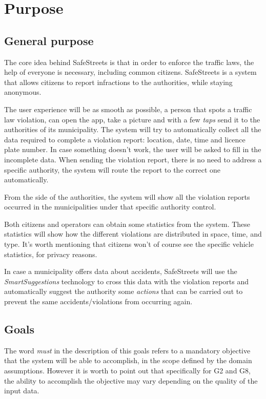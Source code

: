 \section{Purpose}
\subsection{General purpose}
The core idea behind SafeStreets is that in order to enforce the traffic laws,
the help of everyone is necessary, including common citizens.
SafeStreets is a system that allows citizens to report infractions to the
authorities, while staying anonymous.

The user experience will be as smooth as possible, a person that spots a
traffic law violation, can open the app, take a picture and with a few
\emph{taps} send it to the authorities of its municipality.
The system will try to automatically collect all the data required to complete
a violation report: location, date, time and licence plate number. In case
something doesn't work, the user will be asked to fill in the incomplete data.
When sending the violation report, there is no need to address a specific
authority, the system will route the report to the correct one automatically.

From the side of the authorities, the system will show all the violation reports
occurred in the municipalities under that specific authority control.

Both citizens and operators can obtain some statistics from the system. These
statistics will show how the different violations are distributed in space, time,
and type. It's worth mentioning that citizens won't of course see the specific
vehicle statistics, for privacy reasons.

In case a municipality offers data about accidents, SafeStreets will use the
\emph{SmartSuggestions} technology to cross this data with the violation 
reports and automatically suggest the authority some \emph{actions} that can be
carried out to prevent the same accidents/violations from occurring again.

\subsection{Goals}

\begin{description}
\end{description}

\noindent
The word \emph{must} in the description of this goals refers to a mandatory
objective that the system will be able to accomplish, in the scope defined
by the domain assumptions.
However it is worth to point out that specifically for G2 and G8,
the ability to accomplish the objective may vary depending on the
quality of the input data.
